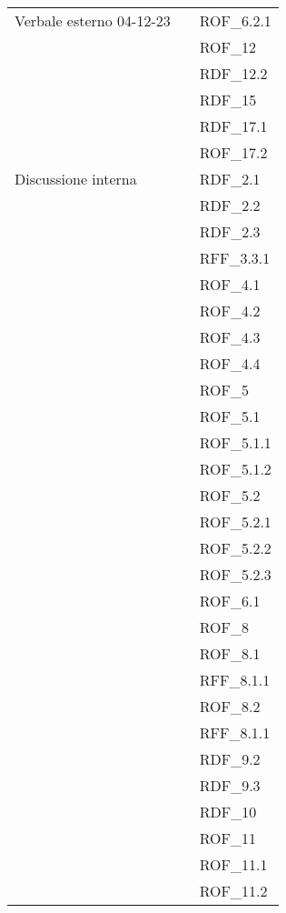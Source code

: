 \begin{xltabular}{\textwidth}{ p{0.3\textwidth} | X | p{0.2\textwidth} }
    Verbale esterno 04-12-23 & & ROF\_6.2.1\\
    &&ROF\_12\\
    &&RDF\_12.2\\
    &&RDF\_15\\
    &&RDF\_17.1\\
    &&ROF\_17.2\\


    Discussione interna & & RDF\_2.1\\ 
    &&RDF\_2.2\\ 
    &&RDF\_2.3\\ 
    &&RFF\_3.3.1\\ 
    &&ROF\_4.1\\ 
    &&ROF\_4.2\\ 
    &&ROF\_4.3\\ 
    &&ROF\_4.4\\ 
    &&ROF\_5\\ 
    &&ROF\_5.1\\ 
    &&ROF\_5.1.1\\ 
    &&ROF\_5.1.2\\ 
    &&ROF\_5.2\\ 
    &&ROF\_5.2.1\\ 
    &&ROF\_5.2.2\\ 
    &&ROF\_5.2.3\\ 
    &&ROF\_6.1\\ 
    &&ROF\_8\\ 
    &&ROF\_8.1\\ 
    &&RFF\_8.1.1\\ 
    &&ROF\_8.2\\ 
    &&RFF\_8.1.1\\ 
    &&RDF\_9.2\\ 
    &&RDF\_9.3\\ 
    &&RDF\_10\\ 
    &&ROF\_11\\ 
    &&ROF\_11.1\\ 
    &&ROF\_11.2\\ 

\end{xltabular}
